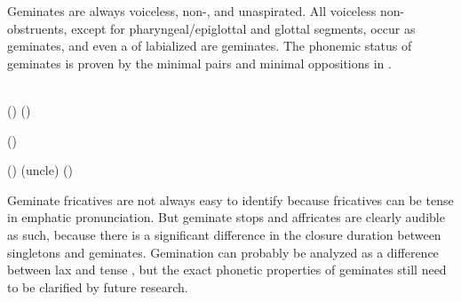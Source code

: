 Geminates are always voiceless, non-, and unaspirated. All voiceless non- obstruents, except for pharyngeal/epiglottal and glottal segments, occur as geminates, and even a  of labialized  are geminates. The phonemic status of geminates is proven by the minimal pairs and minimal oppositions in .
%
\begin{exe}
	\ex	\label{ex:gemination B phon@A}
	\begin{xlist}
\TabPositions{14em}
		\ex	{} 	\tab {} 	\\
		()
		\ex	{} ()  \tab {} 	\label{ex:buqij phon}
	
		\ex	{} 	\tab {}  \label{ex:busij phon}
		
		\ex	{} ()  \tab {}  	\label{ex:bacij phonA}
		
		\ex	{} ()  \tab {}  (uncle)	\label{ex:bacij phonB}
		\ex	{}  () \tab {} 	\label{ex:hetij phonC}
		
	\end{xlist}
\end{exe}

Geminate fricatives are not always easy to identify because fricatives can be tense in emphatic pronunciation. But geminate stops and affricates are clearly audible as such, because there is a significant difference in the closure duration between singletons and geminates. Gemination can probably be analyzed as a difference between lax and tense , but the exact phonetic properties of geminates still need to be clarified by future research.

